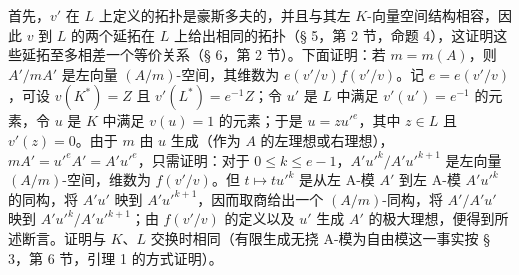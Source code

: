 首先，\(v'\) 在 \(L\) 上定义的拓扑是豪斯多夫的，并且与其左 \(K\)-向量空间结构相容，因此 \(v\) 到 \(L\) 的两个延拓在 \(L\) 上给出相同的拓扑（§ 5，第 2 节，命题 4），这证明这些延拓至多相差一个等价关系（§ 6，第 2 节）。下面证明：若 \(m = m(A)\)，则 \(A'/mA'\) 是左向量 \((A/m)\)-空间，其维数为 \(e(v'/v)f(v'/v)\)。记 \(e = e(v'/v)\)，可设 \(v(K^*) = Z\) 且 \(v'(L^*) = e^{-1}Z\)；令 \(u'\) 是 \(L\) 中满足 \(v'(u') = e^{-1}\) 的元素，令 \(u\) 是 \(K\) 中满足 \(v(u) = 1\) 的元素；于是 \(u = zu'^e\)，其中 \(z \in L\) 且 \(v'(z) = 0\)。由于 \(m\) 由 \(u\) 生成（作为 \(A\) 的左理想或右理想），\(mA' = u'^eA' = A'u'^e\)，只需证明：对于 \(0 \leqslant k \leqslant e - 1\)，\(A'u'^k/A'u'^{k+1}\) 是左向量 \((A/m)\)-空间，维数为 \(f(v'/v)\)。但 \(t \mapsto tu'^k\) 是从左 A-模 \(A'\) 到左 A-模 \(A'u'^k\) 的同构，将 \(A'u'\) 映到 \(A'u'^{k+1}\)，因而取商给出一个 \((A/m)\)-同构，将 \(A'/A'u'\) 映到 \(A'u'^k/A'u'^{k+1}\)；由 \(f(v'/v)\) 的定义以及 \(u'\) 生成 \(A'\) 的极大理想，便得到所述断言。证明与 \(K\)、\(L\) 交换时相同（有限生成无挠 A-模为自由模这一事实按 § 3，第 6 节，引理 1 的方式证明）。

